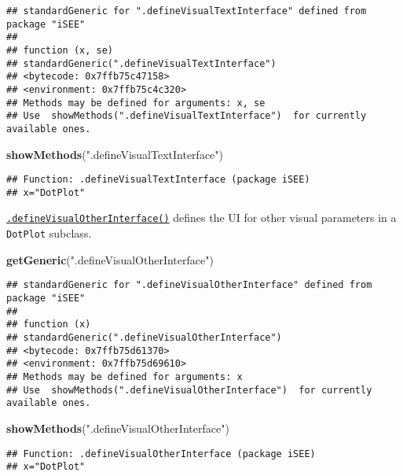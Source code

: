 \documentclass[
]{book}
\newenvironment{Shaded}{\begin{snugshade}}{\end{snugshade}}
\newcommand{\KeywordTok}[1]{\textcolor[rgb]{0.13,0.29,0.53}{\textbf{#1}}}
\newcommand{\NormalTok}[1]{#1}
\newcommand{\StringTok}[1]{\textcolor[rgb]{0.31,0.60,0.02}{#1}}
\begin{document}
\begin{verbatim}
## standardGeneric for ".defineVisualTextInterface" defined from package "iSEE"
## 
## function (x, se) 
## standardGeneric(".defineVisualTextInterface")
## <bytecode: 0x7ffb75c47158>
## <environment: 0x7ffb75c4c320>
## Methods may be defined for arguments: x, se
## Use  showMethods(".defineVisualTextInterface")  for currently available ones.
\end{verbatim}

\begin{Shaded}
\begin{Highlighting}[]
\KeywordTok{showMethods}\NormalTok{(}\StringTok{".defineVisualTextInterface"}\NormalTok{)}
\end{Highlighting}
\end{Shaded}

\begin{verbatim}
## Function: .defineVisualTextInterface (package iSEE)
## x="DotPlot"
\end{verbatim}

\href{https://isee.github.io/iSEE/reference/visual-parameters-generics.html}{\texttt{.defineVisualOtherInterface()}} defines the UI for other visual parameters in a \texttt{DotPlot} subclass.

\begin{Shaded}
\begin{Highlighting}[]
\KeywordTok{getGeneric}\NormalTok{(}\StringTok{".defineVisualOtherInterface"}\NormalTok{)}
\end{Highlighting}
\end{Shaded}

\begin{verbatim}
## standardGeneric for ".defineVisualOtherInterface" defined from package "iSEE"
## 
## function (x) 
## standardGeneric(".defineVisualOtherInterface")
## <bytecode: 0x7ffb75d61370>
## <environment: 0x7ffb75d69610>
## Methods may be defined for arguments: x
## Use  showMethods(".defineVisualOtherInterface")  for currently available ones.
\end{verbatim}

\begin{Shaded}
\begin{Highlighting}[]
\KeywordTok{showMethods}\NormalTok{(}\StringTok{".defineVisualOtherInterface"}\NormalTok{)}
\end{Highlighting}
\end{Shaded}

\begin{verbatim}
## Function: .defineVisualOtherInterface (package iSEE)
## x="DotPlot"
\end{verbatim}
\end{document}
